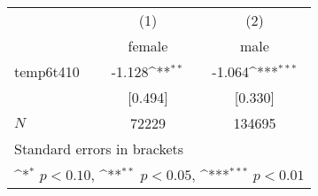 {
\def\sym#1{\ifmmode^{#1}\else\(^{#1}\)\fi}
\begin{tabular}{l*{2}{c}}
\hline\hline
            &\multicolumn{1}{c}{(1)}&\multicolumn{1}{c}{(2)}\\
            &\multicolumn{1}{c}{female}&\multicolumn{1}{c}{male}\\
\hline
temp6t410   &      -1.128\sym{**} &      -1.064\sym{***}\\
            &     [0.494]         &     [0.330]         \\
\hline
\(N\)       &       72229         &      134695         \\
\hline\hline
\multicolumn{3}{l}{\footnotesize Standard errors in brackets}\\
\multicolumn{3}{l}{\footnotesize \sym{*} \(p<0.10\), \sym{**} \(p<0.05\), \sym{***} \(p<0.01\)}\\
\end{tabular}
}
